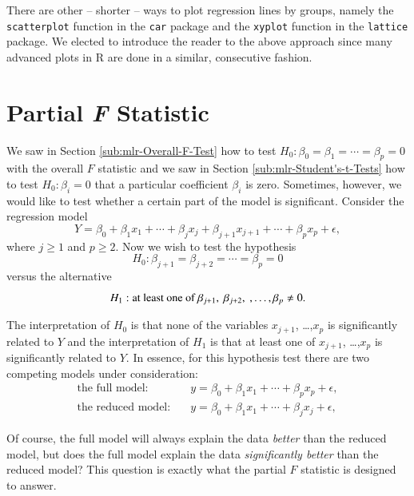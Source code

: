 \documentclass[captions=tableheading]{scrbook}
\begin{document}
There are other -- shorter -- ways to plot regression lines by groups, namely the \texttt{scatterplot} function in the \texttt{car} \cite{car} package and the \texttt{xyplot} function in the \texttt{lattice} package. We elected to introduce the reader to the above approach since many advanced plots in \textsf{R} are done in a similar, consecutive fashion.
\section{Partial \emph{F} Statistic}
\label{sec-7-7}

\label{sec:Partial-F-Statistic}

We saw in Section \ref{sub:mlr-Overall-F-Test} how to test \(H_{0}:\beta_{0}=\beta_{1}=\cdots=\beta_{p}=0\) with the overall \(F\) statistic and we saw in Section \ref{sub:mlr-Student's-t-Tests} how to test \(H_{0}:\beta_{i}=0\) that a particular coefficient \(\beta_{i}\) is zero. Sometimes, however, we would like to test whether a certain part of the model is significant. Consider the regression model
\begin{equation}
Y=\beta_{0}+\beta_{1}x_{1}+\cdots+\beta_{j}x_{j}+\beta_{j+1}x_{j+1}+\cdots+\beta_{p}x_{p}+\epsilon,
\end{equation}
where \(j\geq1\) and \(p\geq2\). Now we wish to test the hypothesis
\begin{equation}
H_{0}:\beta_{j+1}=\beta_{j+2}=\cdots=\beta_{p}=0
\end{equation}
versus the alternative 
\begin{equation}
H_{1}:\mbox{at least one of \ensuremath{\beta_{j+1},\ \beta_{j+2},\ ,\ldots,\beta_{p}\neq0}}.
\end{equation}

The interpretation of \(H_{0}\) is that none of the variables \(x_{j+1}\), \ldots{},\(x_{p}\) is significantly related to \(Y\) and the interpretation of \(H_{1}\) is that at least one of \(x_{j+1}\), \ldots{},\(x_{p}\) is significantly related to \(Y\). In essence, for this hypothesis test there are two competing models under consideration:
\begin{align}
\mbox{the full model:} & \quad y=\beta_{0}+\beta_{1}x_{1}+\cdots+\beta_{p}x_{p}+\epsilon,\\
\mbox{the reduced model:} & \quad y=\beta_{0}+\beta_{1}x_{1}+\cdots+\beta_{j}x_{j}+\epsilon,
\end{align}

Of course, the full model will always explain the data \emph{better} than the reduced model, but does the full model explain the data \emph{significantly better} than the reduced model? This question is exactly what the partial \(F\) statistic is designed to answer.
\end{document}
